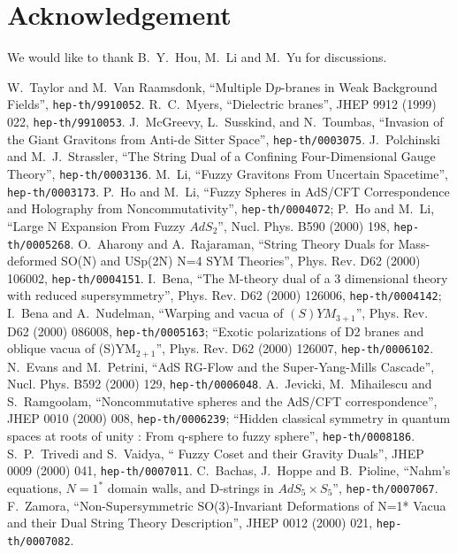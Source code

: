 \documentclass[a4paper,12pt]{article}
\begin{document}
{\section *{Acknowledgement}
We would like to thank B.~Y.~Hou, M.~Li and M.~Yu for discussions.
\newpage
\begin{thebibliography}{30}
 W.~Taylor and M.~Van Raamsdonk, ``Multiple D$p$-branes in Weak Background Fields'', {\tt hep-th/9910052}.
 R.~C.~Myers, ``Dielectric branes'', JHEP 9912 (1999) 022, {\tt hep-th/9910053}.
 J.~McGreevy, L.~Susskind, and N.~Toumbas, ``Invasion of the Giant Gravitons from Anti-de Sitter Space'', {\tt hep-th/0003075}.
 J.~Polchinski and M.~J.~Strassler, ``The String Dual of a Confining Four-Dimensional Gauge Theory'', {\tt hep-th/0003136}.
 M.~Li, ``Fuzzy Gravitons From Uncertain Spacetime'', {\tt hep-th/0003173}.
 P.~Ho and M.~Li, ``Fuzzy Spheres in AdS/CFT Correspondence and Holography from Noncommutativity'', {\tt hep-th/0004072};
P.~Ho and M.~Li, ``Large N Expansion From Fuzzy $AdS_2$'', Nucl. Phys. B590 (2000) 198, {\tt hep-th/0005268}.
 O.~Aharony and A.~Rajaraman, ``String Theory Duals for Mass-deformed SO(N) and USp(2N) N=4 SYM Theories'', Phys. Rev. D62 (2000) 106002, {\tt hep-th/0004151}.
 I.~Bena, ``The M-theory dual of a 3 dimensional theory with reduced supersymmetry'', Phys. Rev. D62 (2000) 126006, {\tt hep-th/0004142};
I.~Bena and A.~Nudelman, ``Warping and vacua of $(S)YM_{3+1}$'', Phys. Rev. D62 (2000) 086008, {\tt hep-th/0005163};
``Exotic polarizations of D2 branes and oblique vacua of (S)YM$_{2+1}$'', Phys. Rev. D62 (2000) 126007, {\tt hep-th/0006102}.
 N.~Evans and M.~Petrini, ``AdS RG-Flow and the Super-Yang-Mills Cascade'', Nucl. Phys. B592 (2000) 129, {\tt hep-th/0006048}.
 A.~Jevicki, M.~Mihailescu and S.~Ramgoolam, ``Noncommutative spheres and the AdS/CFT correspondence'', JHEP 0010 (2000) 008, {\tt hep-th/0006239}; ``Hidden classical symmetry in quantum spaces at roots of unity : From q-sphere to fuzzy sphere'', {\tt hep-th/0008186}.
 S.~P.~Trivedi and S.~Vaidya, `` Fuzzy Coset and their Gravity Duals'', JHEP 0009 (2000) 041, {\tt hep-th/0007011}.
 C.~Bachas, J.~Hoppe and B.~Pioline, ``Nahm's equations, $N=1^*$ domain walls, and D-strings in $AdS_5\times S_5$'', {\tt hep-th/0007067}.
  F.~Zamora, ``Non-Supersymmetric SO(3)-Invariant Deformations of N=1* Vacua and their Dual String Theory Description'', JHEP 0012 (2000) 021, {\tt hep-th/0007082}.

\end{thebibliography}}
\end{document}

